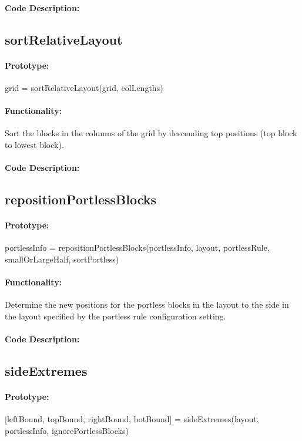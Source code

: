\documentclass[12pt,letterpaper]{report}
\begin{document}
\paragraph{Code Description:}

\subsection{sortRelativeLayout}
\paragraph{Prototype:} grid = sortRelativeLayout(grid, colLengths)
\paragraph{Functionality:} Sort the blocks in the columns of the grid by descending top positions (top block to lowest block).
\paragraph{Code Description:}

\subsection{repositionPortlessBlocks}
\paragraph{Prototype:} portlessInfo = repositionPortlessBlocks(portlessInfo, layout, portlessRule, smallOrLargeHalf, sortPortless)
\paragraph{Functionality:} Determine the new positions for the portless blocks in the layout to the side in the layout specified by the portless rule configuration setting.
\paragraph{Code Description:}

\subsection{sideExtremes}
\paragraph{Prototype:} [leftBound, topBound, rightBound, botBound] = sideExtremes(layout, portlessInfo, ignorePortlessBlocks)
\end{document}
